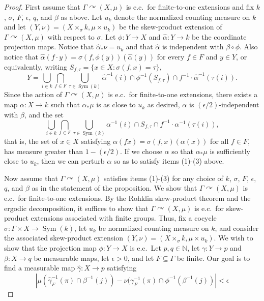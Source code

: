 \documentclass[12pt]{amsart}
\theoremstyle{definition}
\newcommand\bN{{\mathbb N}}
\newcommand{\acts}{\curvearrowright}
\begin{document}
\begin{proof}
First assume that $\Gamma\acts (X,\mu)$ is e.c.\ for finite-to-one extensions and fix $k$, $\sigma$, $F$, $\epsilon$, $q$, and $\beta$ as above. Let $u_k$ denote the normalized counting measure on $k$ and let $(Y, \nu) = (X \times_\sigma k, \mu \times u_k)$ be the skew-product extension of $\Gamma\acts (X, \mu)$ with respect to $\sigma$.
Let $\phi : Y \rightarrow X$ and $\hat{\alpha} : Y \rightarrow k$ be the coordinate projection maps. Notice that $\hat{\alpha}_* \nu = u_k$ and that $\hat{\alpha}$ is independent with $\beta \circ \phi$. Also notice that $\hat{\alpha}(f \cdot y) = \sigma(f, \phi(y)) (\hat{\alpha}(y))$ for every $f \in F$ and $y \in Y$, or equivalently, writing $S_{f, \tau} = \{x \in X : \sigma(f, x) = \tau\}$,
\[Y = \bigcup_{i \in k} \bigcap_{f \in F} \bigcup_{\tau \in \operatorname{Sym}(k)} \hat{\alpha}^{-1}(i) \cap \phi^{-1}(S_{f,\tau}) \cap f^{-1} \cdot \hat{\alpha}^{-1}(\tau(i)).\]
Since the action of $\Gamma\acts (X, \mu)$ is e.c.\ for finite-to-one extensions, there exists a map $\alpha : X \rightarrow k$ such that $\alpha_*\mu$ is as close to $u_k$ as desired, $\alpha$ is $(\epsilon/2)$-independent with $\beta$, and the set
\[\bigcup_{i \in k} \bigcap_{f \in F} \bigcup_{\tau \in \operatorname{Sym}(k)} \alpha^{-1}(i) \cap S_{f,\tau} \cap f^{-1} \cdot \alpha^{-1}(\tau(i)),\]
that is, the set of $x \in X$ satisfying $\alpha(fx) = \sigma(f,x)(\alpha(x))$ for all $f\in F$, has measure greater than $1-(\epsilon/2)$. If we choose $\alpha$ so that $\alpha_* \mu$ is sufficiently close to $u_k$, then we can perturb $\alpha$ so as to satisfy items (1)-(3) above.

Now assume that $\Gamma\acts (X,\mu)$ satisfies items (1)-(3) for any choice of $k$, $\sigma$, $F$, $\epsilon$, $q$, and $\beta$ as in the statement of the proposition.  We show that $\Gamma\acts (X,\mu)$ is e.c.\ for finite-to-one extensions.  By the Rohklin skew-product theorem and the ergodic decomposition, it suffices to show that $\Gamma\acts (X,\mu)$ is e.c.\ for skew-product extensions associated with finite groups.  Thus, fix a cocycle $\sigma:\Gamma\times X\to \operatorname{Sym}(k)$, let $u_k$ be normalized counting measure on $k$, and consider the associated skew-product extension $(Y, \nu) = (X\times_\sigma k, \mu \times u_k)$.  We wish to show that the projection map $\phi : Y \rightarrow X$ is e.c.\ Let $p, q \in \bN$, let $\gamma : Y \rightarrow p$ and $\beta : X \rightarrow q$ be measurable maps, let $\epsilon > 0$, and let $F \subseteq \Gamma$ be finite. Our goal is to find a measurable map $\hat{\gamma} : X \rightarrow p$ satisfying
\begin{equation} \label{eqn:finite-to-one0}
 |\mu(\hat{\gamma}_F^{-1}(\pi) \cap \beta^{-1}(j)) - \nu(\gamma_F^{-1}(\pi) \cap \phi^{-1}(\beta^{-1}(j))| < \epsilon
\end{equation}


\end{proof}
\end{document}
